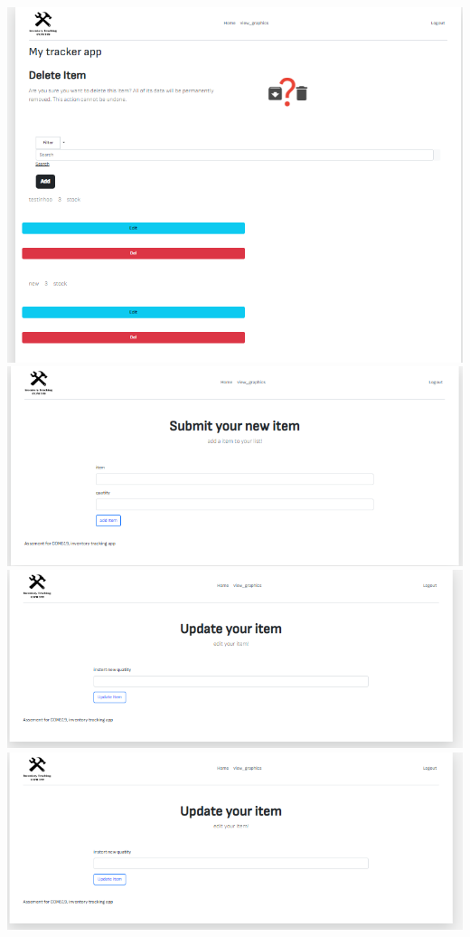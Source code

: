 \includegraphics{./images/vizualization.PNG}
\includegraphics{./images/add.PNG} \includegraphics{./images/edit.PNG}
\includegraphics{./images/edit.PNG}
